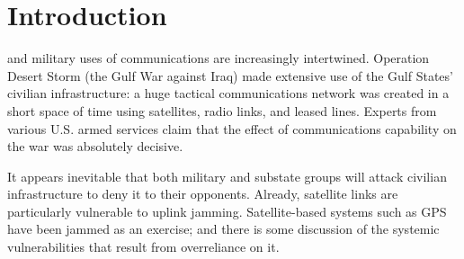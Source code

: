 \documentclass[10pt,journal,compsoc]{IEEEtran}
\begin{document}
\ifCLASSOPTIONcompsoc
{}
\else
\section{Introduction}
\label{sec:introduction}
\fi




%
%
%
%
 and military uses of communications are increasingly intertwined. Operation
Desert Storm (the Gulf War against Iraq) made extensive use of the Gulf States’ civilian
infrastructure: a huge tactical communications network was created in a short space of
time using satellites, radio links, and leased lines. Experts from various U.S. armed
services claim that the effect of communications capability on the war was absolutely
decisive.

It appears inevitable that both military and substate groups will attack
civilian infrastructure to deny it to their opponents. Already, satellite links are particularly
vulnerable to uplink jamming. Satellite-based systems such as GPS have been
jammed as an exercise; and there is some discussion of the systemic vulnerabilities that
result from overreliance on it.
\end{document}
